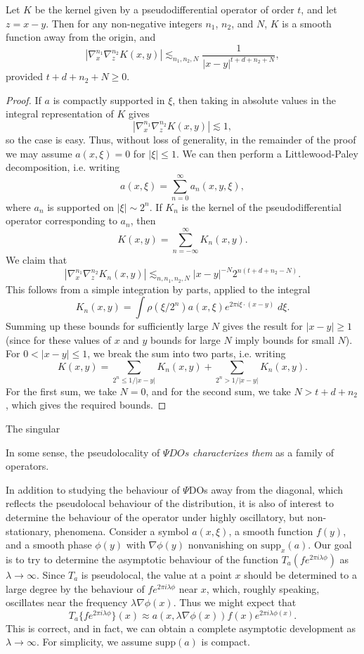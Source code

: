 \begin{theorem}
    Let $K$ be the kernel given by a pseudodifferential operator of order $t$, and let $z = x - y$. Then for any non-negative integers $n_1$, $n_2$, and $N$, $K$ is a smooth function away from the origin, and
    \[ |\nabla^{n_1}_x \nabla^{n_2}_z K(x,y)| \lesssim_{n_1,n_2,N} \frac{1}{|x - y|^{t + d + n_2 + N}}, \]
    provided $t + d + n_2 + N \geq 0$.
\end{theorem}
\begin{proof}
    If $a$ is compactly supported in $\xi$, then taking in absolute values in the integral representation of $K$ gives
    \[ |\nabla^{n_1}_x \nabla^{n_2}_z K(x,y)| \lesssim 1, \]
    so the case is easy. Thus, without loss of generality, in the remainder of the proof we may assume $a(x,\xi) = 0$ for $|\xi| \leq 1$. We can then perform a Littlewood-Paley decomposition, i.e. writing
    \[ a(x,\xi) = \sum_{n = 0}^\infty a_n(x,y,\xi), \]
    where $a_n$ is supported on $|\xi| \sim 2^n$. If $K_n$ is the kernel of the pseudodifferential operator corresponding to $a_n$, then
    \[ K(x,y) = \sum_{n = -\infty}^\infty K_n(x,y). \]
    We claim that
    \[ |\nabla^{n_1}_x \nabla^{n_2}_z K_n(x,y)| \lesssim_{n,n_1,n_2,N} |x - y|^{-N} 2^{n(t + d + n_2 - N)}. \]
    This follows from a simple integration by parts, applied to the integral
    \[ K_n(x,y) = \int \rho(\xi / 2^n) a(x,\xi) e^{2 \pi i \xi \cdot (x - y)}\; d\xi. \]
    Summing up these bounds for sufficiently large $N$ gives the result for $|x - y| \geq 1$ (since for these values of $x$ and $y$ bounds for large $N$ imply bounds for small $N$). For $0 < |x - y| \leq 1$, we break the sum into two parts, i.e. writing
    \[ K(x,y) = \sum_{2^n \leq 1/|x-y|} K_n(x,y) + \sum_{2^n > 1/|x-y|} K_n(x,y). \]
    For the first sum, we take $N = 0$, and for the second sum, we take $N > t + d + n_2$, which gives the required bounds.
\end{proof}

The singular 

In some sense, the pseudolocality of $\Psi DOs$ \emph{characterizes them} as a family of operators.

In addition to studying the behaviour of $\Psi$DOs away from the diagonal, which reflects the pseudolocal behaviour of the distribution, it is also of interest to determine the behaviour of the operator under highly oscillatory, but non-stationary, phenomena. Consider a symbol $a(x,\xi)$, a smooth function $f(y)$, and a smooth phase $\phi(y)$ with $\nabla \phi(y)$ nonvanishing on $\text{supp}_x(a)$. Our goal is to try to determine the asymptotic behaviour of the function $T_a(f e^{2 \pi i \lambda \phi})$ as $\lambda \to \infty$. Since $T_a$ is pseudolocal, the value at a point $x$ should be determined to a large degree by the behaviour of $f e^{2 \pi i \lambda \phi}$ near $x$, which, roughly speaking, oscillates near the frequency $\lambda \nabla \phi(x)$. Thus we might expect that
%
\[ T_a \{ f e^{2 \pi i \lambda \phi} \} (x) \approx a(x,\lambda \nabla \phi(x)) f(x) e^{2 \pi i \lambda \phi(x)}. \]
%
This is correct, and in fact, we can obtain a complete asymptotic development as $\lambda \to \infty$. For simplicity, we assume $\text{supp}(a)$ is compact.

